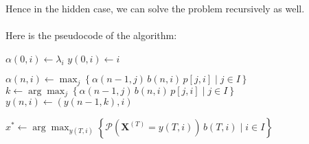 \documentclass{article}
\begin{document}
Hence in the hidden case, we can solve the problem recursively as well. \\
\\
Here is the pseudocode of the algorithm:
\begin{algorithm}[H]
    \begin{algorithmic}
            \State $\alpha(0,i)\gets \lambda_i$
            \State $y(0,i)\gets i$
        \EndFor
    \end{algorithmic}
    \begin{algorithmic}
                \State $\displaystyle \alpha(n,i)\gets \max_{j}\left\{\alpha(n-1,j)\,b(n,i)\,p[j,i]\mid j\in I \right\}$
                \State $\displaystyle k\gets \arg\max_{j}\left\{\alpha(n-1,j)\,b(n,i)\,p[j,i]\mid j\in I \right\}$
                \State $y(n,i)\gets (y(n-1,k),i)$
            \EndFor
        \EndFor
    \end{algorithmic}
    \begin{algorithmic}
        \State $\displaystyle x^*\gets \arg\max_{y(T,i)}\left\{\mathcal{P}\left(\mathbf{X}^{(T)}=y(T,i)\right)\,b(T,i) \mid i\in I\right\}$
    \end{algorithmic}
\end{algorithm}
\end{document}

